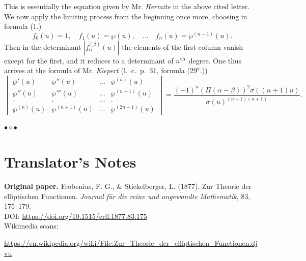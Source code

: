 \documentclass[12pt]{article}
\begin{document}
\medskip

This is essentially the equation given by Mr. \textit{Hermite} in the above cited letter. We now apply the limiting process from the beginning once more, choosing in formula (1.)
\begin{equation*}
f_0(u) = 1, \quad f_1(u) = \wp(u), \quad \dots \quad f_n(u) = \wp^{(n-1)}(u).
\end{equation*}
Then in the determinant $|f_\alpha^{(\beta)}(u)|$ the elements of the first column vanish except for the first, and it reduces to a determinant of $n\textsuperscript{th}$ degree. One thus arrives at the formula of Mr. \textit{Kiepert} (l.~c.~p.~31, formula ($29^a$.))
\begin{equation}
\begin{vmatrix}
\wp'(u) & \wp''(u) & \dots & \wp^{(n)}(u) \\
\wp''(u) & \wp'''(u) & \dots & \wp^{(n+1)}(u) \\
. & . & \dots & . \\
\wp^{(n)}(u) & \wp^{(n+1)}(u) & \dots & \wp^{(2n-1)}(u)
\end{vmatrix}
= \frac{(-1)^n(\Pi(\alpha-\beta))^2\sigma((n+1)u)}{\sigma(u)^{(n+1)(n+1)}}.
\end{equation}

\vspace{1in}
\begin{center}
\raisebox{0.5ex}{\rule{1in}{0.5pt}}\quad$\bullet$\quad$\diamond$\quad$\bullet$\quad\raisebox{0.5ex}{\rule{1in}{0.5pt}}
\end{center}

\newpage
\section*{Translator's Notes}

\vspace{1em}
\noindent\textbf{Original paper.} Frobenius, F. G., \& Stickelberger, L. (1877). 
Zur Theorie der elliptischen Functionen. 
\textit{Journal für die reine und angewandte Mathematik}, 83, 175--179. \\[0.5em]
DOI: \url{https://doi.org/10.1515/crll.1877.83.175} \\
Wikimedia scans: 

{\footnotesize\url{https://en.wikipedia.org/wiki/File:Zur_Theorie_der_elliptischen_Functionen.djvu}}
\vspace{1em}

\end{document}
